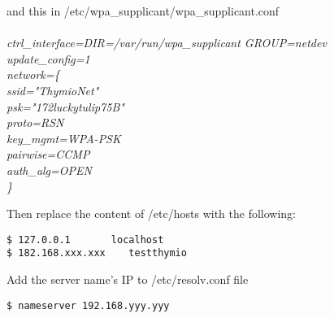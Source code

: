 \documentclass[12pt]{article}%
\begin{document}
			and this in /etc/wpa\_supplicant/wpa\_supplicant.conf	\\\\
		\textit{ctrl\_interface=DIR=/var/run/wpa\_supplicant GROUP=netdev   \\
		update\_config=1\\
		network=\{   \\
			ssid="ThymioNet"   \\
			psk="172luckytulip75B"   \\
			proto=RSN   \\
			key\_mgmt=WPA-PSK   \\
			pairwise=CCMP   \\
			auth\_alg=OPEN   \\
		\}}

		Then replace the content of /etc/hosts with the following:
		\begin{lstlisting}
$ 127.0.0.1       localhost   
$ 182.168.xxx.xxx    testthymio
		\end{lstlisting}
		Add the server name's IP to /etc/resolv.conf file
		\begin{lstlisting}
$ nameserver 192.168.yyy.yyy
		\end{lstlisting}
	
\end{document}
